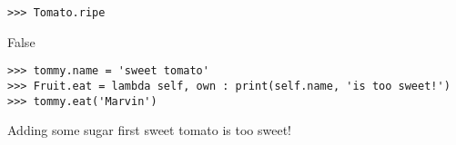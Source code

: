 \begin{blocksection}
\begin{lstlisting}
>>> Tomato.ripe
\end{lstlisting}
\begin{solution}[.2in]
False
\end{solution}

\begin{lstlisting}
>>> tommy.name = 'sweet tomato'
>>> Fruit.eat = lambda self, own : print(self.name, 'is too sweet!')
>>> tommy.eat('Marvin')
\end{lstlisting}
\begin{solution}[.2in]
Adding some sugar first \newline
sweet tomato is too sweet!
\end{solution}
\end{blocksection}
